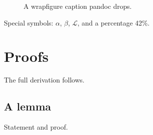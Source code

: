 \documentclass{article}
\begin{document}
\begin{figure}
\caption{A wrapfigure caption pandoc drops.}
\label{fig:one}
\end{figure}

Special symbols: $\alpha$, $\beta$, $\mathcal{L}$, and a percentage 42\%.

\appendix
\section{Proofs}\label{app:proofs}
The full derivation follows.

\subsection{A lemma}\label{app:lemma}
Statement and proof.


\end{document}
